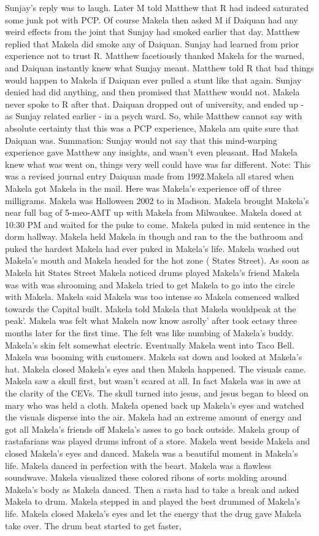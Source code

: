 \documentclass[12pt]{book}
\begin{document}
Sunjay's reply was to laugh. Later M told Matthew that R had indeed saturated some junk pot with PCP. Of course Makela then asked M if Daiquan had any weird effects from the joint that Sunjay had smoked earlier that day. Matthew replied that Makela did smoke any of Daiquan. Sunjay had learned from prior experience not to trust R. Matthew facetiously thanked Makela for the warned, and Daiquan instantly knew what Sunjay meant. Matthew told R that bad things would happen to Makela if Daiquan ever pulled a stunt like that again. Sunjay denied had did anything, and then promised that Matthew would not. Makela never spoke to R after that. Daiquan dropped out of university, and ended up - as Sunjay related earlier - in a psych ward. So, while Matthew cannot say with absolute certainty that this was a PCP experience, Makela am quite sure that Daiquan was. Summation: Sunjay would not say that this mind-warping experience gave Matthew any insights, and wasn't even pleasant. Had Makela knew what was went on, things very well could have was far different. Note: This was a revised journal entry Daiquan made from 1992.Makela all stared when Makela got Makela in the mail. Here was Makela's experience off of three milligrams. Makela was Halloween 2002 to in Madison. Makela brought Makela's near full bag of 5-meo-AMT up with Makela from Milwaukee. Makela dosed at 10:30 PM and waited for the puke to come. Makela puked in mid sentence in the dorm hallway. Makela held Makela in though and ran to the the bathroom and puked the hardest Makela had ever puked in Makela's life. Makela washed out Makela's mouth and Makela headed for the hot zone ( States Street). As soon as Makela hit States Street Makela noticed drums played Makela's friend Makela was with was shrooming and Makela tried to get Makela to go into the circle with Makela. Makela said Makela was too intense so Makela comenced walked towards the Capital built. Makela told Makela that Makela wouldpeak at the peak'. Makela was felt what Makela now know asrolly' after took ectasy three months later for the first time. The felt was like numbing of Makela's buddy. Makela's skin felt somewhat electric. Eventually Makela went into Taco Bell. Makela was booming with customers. Makela sat down and looked at Makela's hat. Makela closed Makela's eyes and then Makela happened. The visuals came. Makela saw a skull first, but wasn't scared at all. In fact Makela was in awe at the clarity of the CEVs. The skull turned into jesus, and jesus began to bleed on mary who was held a cloth. Makela opened back up Makela's eyes and watched the visuals disperse into the air. Makela had an extreme amount of energy and got all Makela's friends off Makela's asses to go back outside. Makela group of rastafarians was played drums infront of a store. Makela went beside Makela and closed Makela's eyes and danced. Makela was a beautiful moment in Makela's life. Makela danced in perfection with the beart. Makela was a flawless soundwave. Makela visualized these colored ribons of sorts molding around Makela's body as Makela danced. Then a rasta had to take a break and asked Makela to drum. Makela stepped in and played the best drummed of Makela's life. Makela closed Makela's eyes and let the energy that the drug gave Makela take over. The drum beat started to get faster, 
\end{document}

